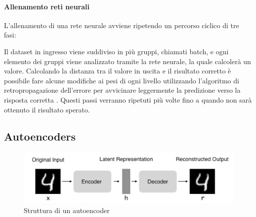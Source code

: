 \paragraph{Allenamento reti neurali}

L'allenamento di una rete neurale avviene ripetendo un percorso ciclico di tre fasi:

Il dataset in ingresso viene suddiviso in più gruppi, chiamati batch, e ogni elemento dei gruppi viene analizzato tramite la rete neurale, la quale calcolerà un valore. Calcolando la distanza tra il valore in uscita e il risultato corretto è 
possibile fare alcune modifiche ai pesi di ogni livello utilizzando l'algoritmo di retropropagazione dell'errore per avvicinare leggermente la predizione verso la risposta corretta \cite{reti_neurali_libro}. 
Questi passi verranno ripetuti più volte fino a quando non sarà ottenuto il risultato sperato.

\subsection{Autoencoders}
\begin{figure}[h]
    \includegraphics[width=\hsize]{images/reti_neurali/autoencoder.png}
    \caption{Struttura di un autoencoder}
    \label{fig:autoencoder}
    \centering
\end{figure}


